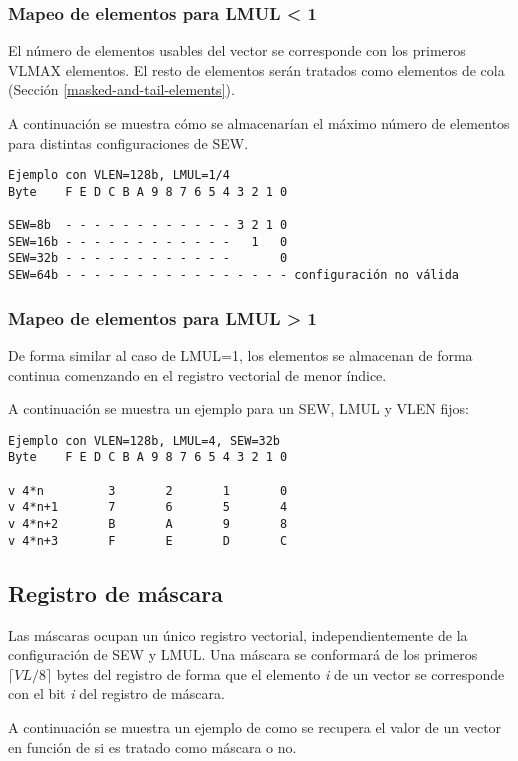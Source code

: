 \subsubsection{Mapeo de elementos para LMUL < 1}
El número de elementos usables del vector se corresponde con los primeros VLMAX
elementos. El resto de elementos serán tratados como elementos de cola
(Sección \ref{masked-and-tail-elements}).

A continuación se muestra cómo se almacenarían el máximo número de elementos
para distintas configuraciones de SEW.
\begin{lstlisting}
Ejemplo con VLEN=128b, LMUL=1/4
Byte    F E D C B A 9 8 7 6 5 4 3 2 1 0

SEW=8b  - - - - - - - - - - - - 3 2 1 0
SEW=16b - - - - - - - - - - - -   1   0
SEW=32b - - - - - - - - - - - -       0
SEW=64b - - - - - - - - - - - - - - - - configuración no válida
\end{lstlisting}


\subsubsection{Mapeo de elementos para LMUL > 1}
De forma similar al caso de LMUL=1, los elementos se almacenan de forma
continua comenzando en el registro vectorial de menor índice.

A continuación se muestra un ejemplo para un SEW, LMUL y VLEN fijos:
\begin{lstlisting}
Ejemplo con VLEN=128b, LMUL=4, SEW=32b
Byte    F E D C B A 9 8 7 6 5 4 3 2 1 0

v 4*n         3       2       1       0
v 4*n+1       7       6       5       4 
v 4*n+2       B       A       9       8
v 4*n+3       F       E       D       C 
\end{lstlisting}

\subsection{Registro de máscara}{\label{mask-reg}}
Las máscaras ocupan un único registro vectorial, independientemente de la
configuración de SEW y LMUL. Una máscara se conformará de los primeros $\lceil
VL/8\rceil$ bytes del registro de forma que el elemento
\textit{i} de un vector se corresponde con el bit \textit{i} del registro de
máscara.

A continuación se muestra un ejemplo de como se recupera el
valor de un vector en función de si es tratado como máscara o no.

